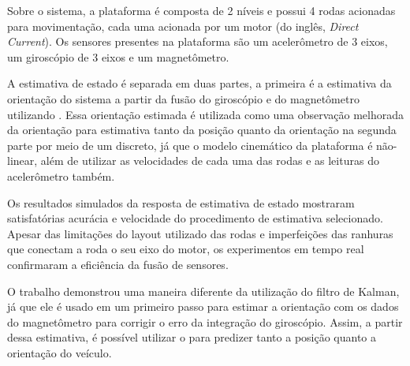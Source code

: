 \documentclass[acronym, symbols, table, deposito]{fei}
\begin{document}
Sobre o sistema, a plataforma é composta de 2 níveis e possui 4 rodas acionadas para movimentação, cada uma acionada por um motor  (do inglês, \textit{Direct Current}). Os sensores presentes na plataforma são um acelerômetro de 3 eixos, um giroscópio de 3 eixos e um magnetômetro.

A estimativa de estado é separada em duas partes, a primeira é a estimativa da orientação do sistema a partir da fusão do giroscópio e do magnetômetro utilizando . Essa orientação estimada é utilizada como uma observação melhorada da orientação para estimativa tanto da posição quanto da orientação na segunda parte por meio de um  discreto, já que o modelo cinemático da plataforma é não-linear, além de utilizar as velocidades de cada uma das rodas e as leituras do acelerômetro também.

Os resultados simulados da resposta de estimativa de estado mostraram satisfatórias acurácia e velocidade do procedimento de estimativa selecionado. Apesar das limitações do layout utilizado das rodas e imperfeições das ranhuras que conectam a roda o seu eixo do motor, os experimentos em tempo real confirmaram a eficiência da fusão de sensores.

O trabalho demonstrou uma maneira diferente da utilização do filtro de Kalman, já que ele é usado em um primeiro passo para estimar a orientação com os dados do magnetômetro para corrigir o erro da integração do giroscópio. Assim, a partir dessa estimativa, é possível utilizar o  para predizer tanto a posição quanto a orientação do veículo.

%	
\end{document}
